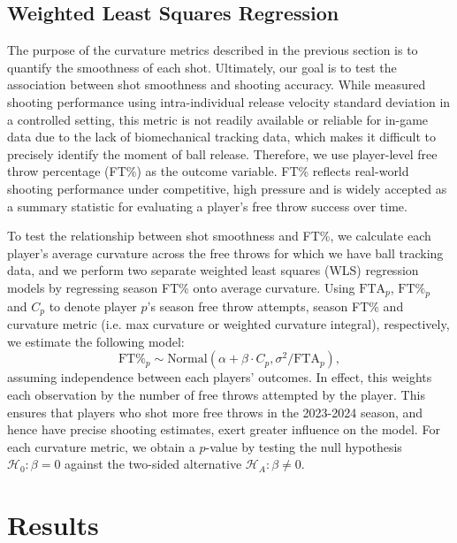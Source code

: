 \documentclass{article}
\begin{document}
    \subsection{Weighted Least Squares Regression}

      The purpose of the curvature metrics described in the previous section is to quantify the smoothness of each shot. Ultimately, our goal is to test the association between shot smoothness and shooting accuracy. While \citet{slegers_role_2024} measured shooting performance using intra-individual release velocity standard deviation in a controlled setting, this metric is not readily available or reliable for in-game data due to the lack of biomechanical tracking data, which makes it difficult to precisely identify the moment of ball release. Therefore, we use player-level free throw percentage (FT\%) as the outcome variable. FT\% reflects real-world shooting performance under competitive, high pressure and is widely accepted as a summary statistic for evaluating a player’s free throw success over time.

      To test the relationship between shot smoothness and FT\%, we calculate each player's average curvature across the free throws for which we have ball tracking data, and we perform two separate weighted least squares (WLS) regression models by regressing season FT\% onto average curvature. Using \(\mbox{FTA}_p\), \(\mbox{FT\%}_p\) and \(C_p\) to denote player $p$'s season free throw attempts, season FT\% and curvature metric (i.e. max curvature or weighted curvature integral), respectively, we estimate the following model:
      \begin{equation}
      \label{eqn:weighted-least-squares}
        \mbox{FT\%}_p \sim \mbox{Normal}(\alpha + \beta \cdot C_p, \sigma^2 / \mbox{FTA}_p),
      \end{equation}
      assuming independence between each players' outcomes. In effect, this weights each observation by the number of free throws attempted by the player. This ensures that players who shot more free throws in the 2023-2024 season, and hence have precise shooting estimates, exert greater influence on the model. For each curvature metric, we obtain a $p$-value by testing the null hypothesis $\mathcal{H}_0: \beta = 0$ against the two-sided alternative $\mathcal{H}_A: \beta \ne 0$.
    
\section{Results}
    
\end{document}
